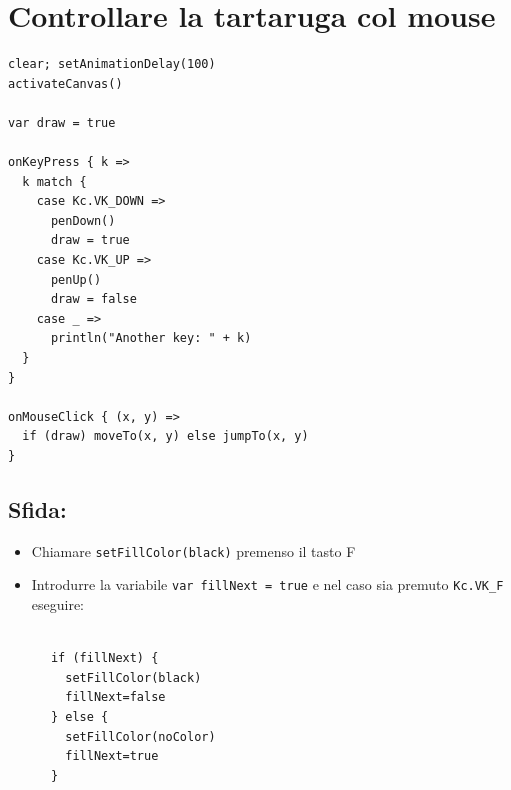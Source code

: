 \chapter{Controllare la tartaruga col mouse}
\begin{multicols}{2}

\begin{lstlisting}[basicstyle={\ttfamily\fontsize{16}{19}\selectfont},numbers=none]
clear; setAnimationDelay(100)
activateCanvas()

var draw = true

onKeyPress { k =>
  k match {
    case Kc.VK_DOWN => 
      penDown()
      draw = true
    case Kc.VK_UP => 
      penUp()
      draw = false
    case _ => 
      println("Another key: " + k)
  }
}

onMouseClick { (x, y) =>
  if (draw) moveTo(x, y) else jumpTo(x, y)
}
\end{lstlisting}
        


\columnbreak


\section*{\color{BrickRed}Sfida:}


\begin{itemize}

\item {Chiamare \lstinline{setFillColor(black)} premenso il tasto F}
\item {Introdurre la variabile \lstinline{var fillNext = true} e nel caso sia premuto \lstinline{Kc.VK_F} eseguire:}

\end{itemize}



\begin{lstlisting}[numbers=none]

      if (fillNext) {
        setFillColor(black)
        fillNext=false
      } else {
        setFillColor(noColor)
        fillNext=true
      }
      
\end{lstlisting}
        
\end{multicols}

